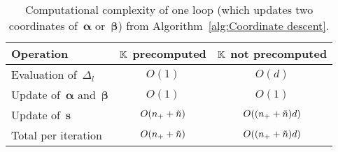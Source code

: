 \begin{table}[h]
  \centering
  \begin{tabular}{lcc} 
    \toprule
    Operation
      & $\mathbb{K}$ precomputed
      & $\mathbb{K}$ not precomputed \\
    \midrule
    Evaluation of~$\Delta_l$
      & $O(1)$
      & $O(d)$ \\
    Update of~$\bm{\alpha}$ and~$\bm{\beta}$
      & $O(1)$
      & $O(1)$ \\
    Update of~$\bm{s}$
      & $O(n_{+} + \tilde{n})$
      & $O((n_{+} + \tilde{n})d)$ \\
    \midrule
    Total per iteration
      & $O(n_{+} + \tilde{n})$
      & $O((n_{+} + \tilde{n})d)$ \\
    \bottomrule
  \end{tabular}
  \caption{Computational complexity of one \repeatloop loop (which updates two coordinates of~$\bm{\alpha}$ or~$\bm{\beta}$) from Algorithm~\ref{alg:Coordinate descent}.}
  \label{tab:Computational complexity}
\end{table}